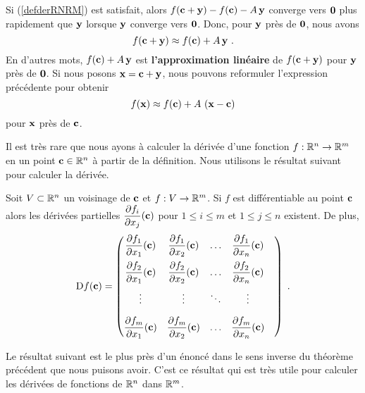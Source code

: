 {Si (\ref{defderRNRM}) est satisfait, alors
$f(\mathbf{c}+\mathbf{y})-f(\mathbf{c})- A\,\mathbf{y}$ converge vers $\mathbf{0}$
plus rapidement que $\mathbf{y}$ lorsque $\mathbf{y}$ converge vers
$\mathbf{0}$.  Donc, pour $\mathbf{y}$ près de $\mathbf{0}$, nous avons
\[
  f(\mathbf{c}+\mathbf{y})\approx f(\mathbf{c}) + A\,\mathbf{y} \ .
\]
En d'autres mots, $f(\mathbf{c}) + A\,\mathbf{y}$ est
{\bfseries l'approximation linéaire} de
$f(\mathbf{c}+\mathbf{y})$ pour $\mathbf{y}$ près de $\mathbf{0}$.  Si nous posons
$\mathbf{x} = \mathbf{c} + \mathbf{y}$, nous pouvons reformuler l'expression
précédente pour obtenir
\[
  f(\mathbf{x})\approx f(\mathbf{c}) + A\,\left(\mathbf{x} - \mathbf{c}\right)
\]
pour $\mathbf{x}$ près de $\mathbf{c}$.

Il est très rare que nous ayons à calculer la dérivée d'une fonction
$f:\mathbb{R}^n\rightarrow \mathbb{R}^m$ en un point $\mathbf{c}\in \mathbb{R}^n$ à partir de la
définition.  Nous utilisons le résultat suivant pour calculer la dérivée.

\begin{focus}{\thm}
Soit $V\subset \mathbb{R}^n$ un voisinage de $\mathbf{c}$ et $f:V\rightarrow \mathbb{R}^m$.
Si $f$ est différentiable au point $\mathbf{c}$ alors les dérivées partielles
$\displaystyle \frac{\partial f_i}{\partial x_j}(\mathbf{c})$ pour $1\leq i \leq m$ et
$1\leq j \leq n$ existent.  De plus,
\[
\mathrm{D} f(\mathbf{c}) =
\begin{pmatrix}
\displaystyle \frac{\partial f_1}{\partial x_1}(\mathbf{c}) &
\displaystyle \frac{\partial f_1}{\partial x_2}(\mathbf{c}) & \ldots &
\displaystyle \frac{\partial f_1}{\partial x_n}(\mathbf{c}) \\[1em]
\displaystyle \frac{\partial f_2}{\partial x_1}(\mathbf{c}) &
\displaystyle \frac{\partial f_2}{\partial x_2}(\mathbf{c}) & \ldots &
\displaystyle \frac{\partial f_2}{\partial x_n}(\mathbf{c}) \\[1em]
\vdots & \vdots & \ddots & \vdots & \\[1em]
\displaystyle \frac{\partial f_m}{\partial x_1}(\mathbf{c}) &
\displaystyle \frac{\partial f_m}{\partial x_2}(\mathbf{c}) & \ldots &
\displaystyle \frac{\partial f_m}{\partial x_n}(\mathbf{c})
\end{pmatrix} \; .
\]
\end{focus}

Le résultat suivant est le plus près d'un énoncé dans le sens inverse
du théorème précédent que nous puisons avoir.  C'est ce résultat qui
est très utile pour calculer les dérivées de fonctions de $\mathbb{R}^n$ dans
$\mathbb{R}^m$.

}

